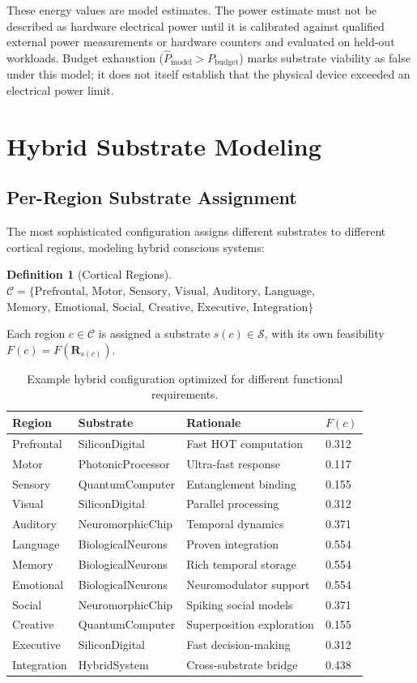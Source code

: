 \documentclass[12pt,a4paper]{article}
\newtheorem{definition}{Definition}
\begin{document}
These energy values are model estimates. The power estimate must not be described as hardware electrical power until it is calibrated against qualified external power measurements or hardware counters and evaluated on held-out workloads. Budget exhaustion ($\widehat{P}_{\text{model}} > P_{\text{budget}}$) marks substrate viability as false under this model; it does not itself establish that the physical device exceeded an electrical power limit.

\section{Hybrid Substrate Modeling}

\subsection{Per-Region Substrate Assignment}

The most sophisticated configuration assigns different substrates to different cortical regions, modeling hybrid conscious systems:

\begin{definition}[Cortical Regions]
$\mathcal{C} = \{\text{Prefrontal, Motor, Sensory, Visual, Auditory, Language,}$ $\text{Memory, Emotional, Social, Creative, Executive, Integration}\}$
\end{definition}

Each region $c \in \mathcal{C}$ is assigned a substrate $s(c) \in \mathcal{S}$, with its own feasibility $F(c) = F(\mathbf{R}_{s(c)})$.

\begin{table}[H]
\centering
\caption{Example hybrid configuration optimized for different functional requirements.}
\label{tab:hybrid}
\begin{tabular}{llll}
\toprule
\textbf{Region} & \textbf{Substrate} & \textbf{Rationale} & $F(c)$ \\
\midrule
Prefrontal & SiliconDigital & Fast HOT computation & 0.312 \\
Motor & PhotonicProcessor & Ultra-fast response & 0.117 \\
Sensory & QuantumComputer & Entanglement binding & 0.155 \\
Visual & SiliconDigital & Parallel processing & 0.312 \\
Auditory & NeuromorphicChip & Temporal dynamics & 0.371 \\
Language & BiologicalNeurons & Proven integration & 0.554 \\
Memory & BiologicalNeurons & Rich temporal storage & 0.554 \\
Emotional & BiologicalNeurons & Neuromodulator support & 0.554 \\
Social & NeuromorphicChip & Spiking social models & 0.371 \\
Creative & QuantumComputer & Superposition exploration & 0.155 \\
Executive & SiliconDigital & Fast decision-making & 0.312 \\
Integration & HybridSystem & Cross-substrate bridge & 0.438 \\
\bottomrule
\end{tabular}
\end{table}
\end{document}
